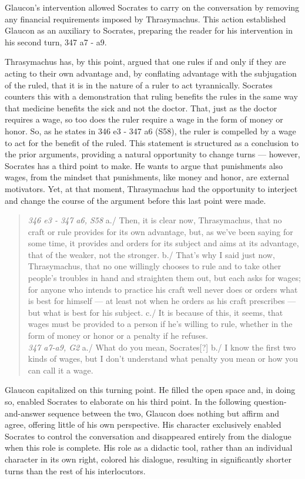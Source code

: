 \documentclass[noraggedright]{turabian-researchpaper}
\begin{document}
Glaucon's intervention allowed Socrates to carry on the conversation by removing any financial requirements imposed by Thrasymachus. This action established Glaucon as an auxiliary to Socrates, preparing the reader for his intervention in his second turn, 347 a7 - a9.

Thrasymachus has, by this point, argued that one rules if and only if they are acting to their own advantage and, by conflating advantage with the subjugation of the ruled, that it is in the nature of a ruler to act tyrannically. Socrates counters this with a demonstration that ruling benefits the rules in the same way that medicine benefits the sick and not the doctor. That, just as the doctor requires a wage, so too does the ruler require a wage in the form of money or honor. So, as he states in 346 e3 - 347 a6 (S58), the ruler is compelled by a wage to act for the benefit of the ruled. This statement is structured as a conclusion to the prior arguments, providing a natural opportunity to change turns — however, Socrates has a third point to make. He wants to argue that punishments also wages, from the mindset that punishments, like money and honor, are external motivators. Yet, at that moment, Thrasymachus had the opportunity to interject and change the course of the argument before this last point were made. 

\begin{quote}
\emph{346 e3 - 347 a6, S58} a./ Then, it is clear now, Thrasymachus, that no craft or rule provides for its own advantage, but, as we've been saying for some time, it provides and orders for its subject and aims at its advantage, that of the weaker, not the stronger. b./ That's why I said just now, Thrasymachus, that no one willingly chooses to rule and to take other people's troubles in hand and straighten them out, but each asks for wages; for anyone who intends to practice his craft well never does or orders what is best for himself — at least not when he orders as his craft prescribes — but what is best for his subject. c./ It is because of this, it seems, that wages must be provided to a person if he's willing to rule, whether in the form of money or honor or a penalty if he refuses.\\
\emph{347 a7-a9, G2} a./ What do you mean, Socrates[?] b./ I know the first two kinds of wages, but I don't understand what penalty you mean or how you can call it a wage.
\end{quote}

Glaucon capitalized on this turning point. He filled the open space and, in doing so, enabled Socrates to elaborate on his third point. In the following question-and-answer sequence between the two, Glaucon does nothing but affirm and agree, offering little of his own perspective. His character exclusively enabled Socrates to control the conversation and disappeared entirely from the dialogue when this role is complete. His role as a didactic tool, rather than an individual character in its own right, colored his dialogue, resulting in significantly shorter turns than the rest of his interlocutors.
\end{document}
